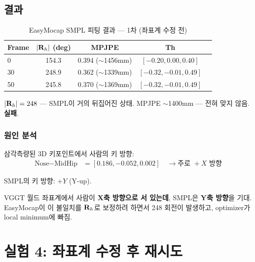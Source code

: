 \documentclass[11pt, a4paper]{report}
\begin{document}
\section{결과}

\begin{table}[H]
\centering
\caption{EasyMocap SMPL 피팅 결과 --- 1차 (좌표계 수정 전)}
\renewcommand{\arraystretch}{1.3}
\begin{tabular}{l cccc}
\toprule
\textbf{Frame} & $|\mathbf{R}_h|$ (deg) & MPJPE & \textbf{Th} \\
\midrule
0 & 154.3 & 0.394 ($\sim$1456mm) & $[-0.20, 0.00, 0.40]$ \\
30 & 248.9 & 0.362 ($\sim$1339mm) & $[-0.32, -0.01, 0.49]$ \\
50 & 245.8 & 0.370 ($\sim$1369mm) & $[-0.32, -0.01, 0.49]$ \\
\bottomrule
\end{tabular}
\end{table}

\begin{warningbox}
$|\mathbf{R}_h| = 248$\textdegree{} --- SMPL이 거의 뒤집어진 상태. MPJPE $\sim$1400mm --- 전혀 맞지 않음. \textcolor{hard}{\textbf{실패}}.
\end{warningbox}

\subsection{원인 분석}

삼각측량된 3D 키포인트에서 사람의 키 방향:
\begin{align*}
\text{Nose} - \text{MidHip} &= [0.186, -0.052, 0.002] \quad \rightarrow \text{주로 } +X \text{ 방향}
\end{align*}

SMPL의 키 방향: $+Y$ (Y-up).

\begin{keyidea}
VGGT 월드 좌표계에서 사람이 \textbf{X축 방향으로 서 있는데}, SMPL은 \textbf{Y축 방향}을 기대. EasyMocap이 이 불일치를 $\mathbf{R}_h$로 보정하려 하면서 248\textdegree{} 회전이 발생하고, optimizer가 local minimum에 빠짐.
\end{keyidea}


\chapter{실험 4: 좌표계 수정 후 재시도}
\end{document}
